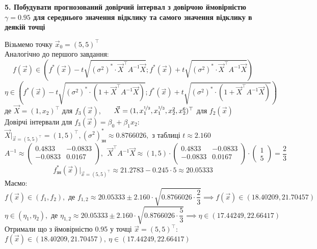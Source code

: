 \documentclass[12 pt]{article}
\newcommand*\circled[1]{\tikz[baseline=(char.base)]{
            \node[shape=circle,draw,inner sep=2pt] (char) {#1};}}
\begin{document}
\begin{center}
    \textbf{
        5. Побудувати прогнозований довірчий інтервал з довірчою ймовірністю $\gamma=0.95$ 
        для середнього значення відклику та самого значення відклику в деякій точці 
    }
\end{center}
Візьмемо точку $\vec{x}_0 = (5,5)^\top$  \\ 
Аналогічно до першого завдання: \\ 
$$
f(\vec{x}) \in \left(
    f^*(\vec{x}) -t \sqrt{(\sigma^2)^* \cdot  \vec{X}^\top A^{-1} \vec{X}};
    f^*(\vec{x}) +t \sqrt{(\sigma^2)^* \cdot  \vec{X}^\top A^{-1} \vec{X}}
\right)
$$ 
$$
\eta \in \left(
    f^*(\vec{x}) - t \sqrt{(\sigma^2)^* \cdot  (1 + \vec{X}^\top A^{-1} \vec{X})};
    f^*(\vec{x}) + t \sqrt{(\sigma^2)^* \cdot   (1+\vec{X}^\top A^{-1} \vec{X})}
\right)
$$
де $\vec{X} = (1, x_2)^\top$ для $f_3(\vec{x})$, \ \ \ $\vec{X} = 
(1,x_1^{\nicefrac{1}{2}}, x_1^{\nicefrac{1}{3}}, x_2^2, x_2^6)^\top$ для $f_2(\vec{x})$  \\ 
\circled{1} Довірчі інтервали для $f_3(\vec{x}) = \beta_0 + \beta_1 x_2 $: \\ 
$\vec{X} |_{\vec{x} = (5,5)^\top} = (1, 5)^\top, (\sigma^2)^*_\text{зн} \approx 0.8766026,$
з таблиці $
t \approx 2.160$ \\ 
$$
A^{-1} \approx \begin{pmatrix}0.4833 &-0.0833 \\
    -0.0833 &0.0167 \\
    \end{pmatrix}, \ \ 
    \vec{X}^\top A^{-1} \vec{X} \approx
    (1, 5) \cdot 
    \begin{pmatrix}
    0.4833 & -0.0833 \\
    -0.0833 & 0.0167 \\
    \end{pmatrix}
    \cdot \begin{pmatrix}
        1 \\ 5
    \end{pmatrix} = \frac{2}{3}
$$
$$
f_\text{зн}^*(\vec{x})|_{\vec{x} = (5,5)^\top} \approx 21.2783 - 0.245 \cdot 5 \approx 20.05333
$$
Маємо:
$$
f(\vec{x}) \in (f_1, f_2), \text{ де } f_{1,2} \approx 
20.05333 \pm 2.160 \cdot \sqrt{0.8766026 \cdot \frac{2}{3}} \implies
f(\vec{x}) \in (18.40209,21.70457)
$$
$$
\eta \in (\eta_1 , \eta_2 ), \text{ де } \eta_{1,2} \approx 
20.05333 \pm 2.160 \cdot \sqrt{0.8766026 \cdot \frac{5}{3}} \implies
\eta \in (17.44249,22.66417)
$$
Отримали що з ймовірністю 0.95 у точці $\vec{x} = (5,5)^\top$: 
$f(\vec{x}) \in (18.40209,21.70457), \  \eta \in (17.44249,22.66417)$ 
\end{document}
